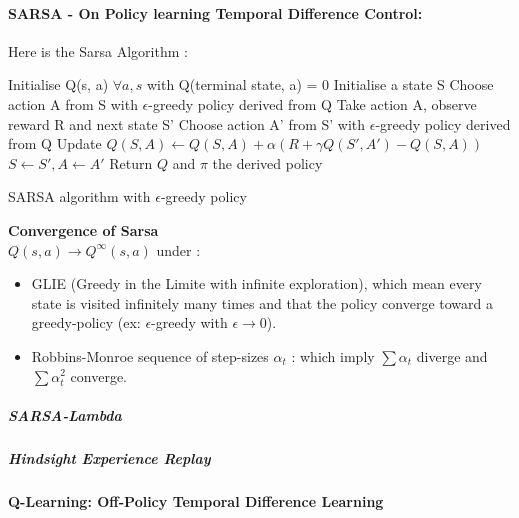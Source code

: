 		\paragraph*{SARSA - On Policy learning Temporal Difference Control:}
			Here is the Sarsa Algorithm : \\
			\begin{algorithm}[H]
				Initialise Q(s, a) $\forall a, s$ with Q(terminal state, a) = 0  \;
				{
					Initialise a state S\;
					Choose action A from S with $\epsilon$-greedy policy derived from Q\;
					{
						Take action A, observe reward R and next state S'\;
						Choose action A' from S' with $\epsilon$-greedy policy derived from Q\;
						Update $Q(S, A) \leftarrow Q(S, A) + \alpha (R + \gamma Q(S', A')- Q(S, A))$\;
						$S \leftarrow S', A \leftarrow A'$
					}
				}
				Return $Q$ and $\pi$ the derived policy
				\caption{SARSA algorithm with $\epsilon$-greedy policy}
			\end{algorithm}

			\begin{theorem}
				\textbf{Convergence of Sarsa} \\
				$Q(s, a) \rightarrow Q^\infty(s,a)$ under :
				\begin{itemize}
					\item GLIE (Greedy in the Limite with infinite exploration), which mean every state is visited infinitely many times and that the policy converge toward a greedy-policy (ex: $\epsilon$-greedy with $\epsilon\rightarrow 0$).
					\item Robbins-Monroe sequence of step-sizes $\alpha_t$ : which imply $\sum \alpha_t$ diverge and $\sum \alpha_t^2$ converge.
				\end{itemize}
			\end{theorem}

			\subparagraph*{SARSA-Lambda}
			\subparagraph*{Hindsight Experience Replay}

		\paragraph*{Q-Learning: Off-Policy Temporal Difference Learning}

